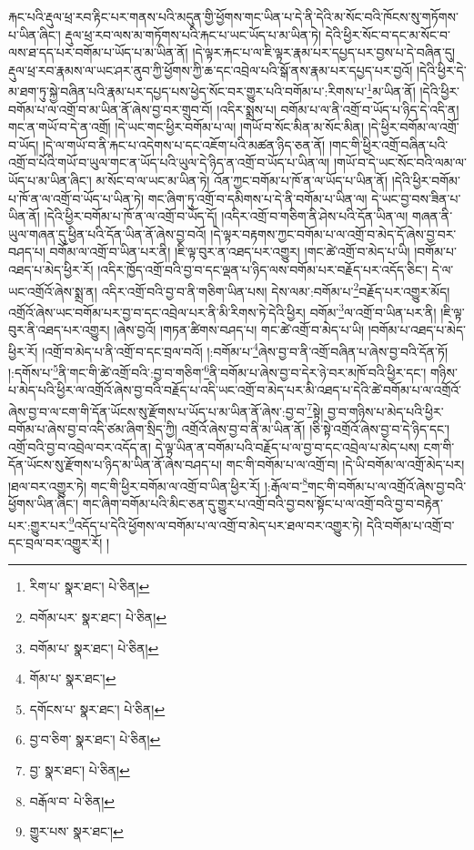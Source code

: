 རྐང་པའི་རྡུལ་ཕྲ་རབ་རྟིང་པར་གནས་པའི་མདུན་གྱི་ཕྱོགས་གང་ཡིན་པ་དེ་ནི་དེའི་མ་སོང་བའི་ཁོངས་སུ་གཏོགས་པ་ཡིན་ཞིང་། རྡུལ་ཕྲ་རབ་ལས་མ་གཏོགས་པའི་རྐང་པ་ཡང་ཡོད་པ་མ་ཡིན་ཏེ། དེའི་ཕྱིར་སོང་བ་དང་མ་སོང་བ་ལས་ཐ་དད་པར་བགོམ་པ་ཡོད་པ་མ་ཡིན་ནོ། །དེ་ལྟར་རྐང་པ་ལ་ཇི་ལྟར་རྣམ་པར་དཔྱད་པར་བྱས་པ་དེ་བཞིན་དུ། རྡུལ་ཕྲ་རབ་རྣམས་ལ་ཡང་ཤར་ནུབ་ཀྱི་ཕྱོགས་ཀྱི་ཆ་དང་འབྲེལ་པའི་སྒོ་ནས་རྣམ་པར་དཔྱད་པར་བྱའོ། །དེའི་ཕྱིར་དེ་མ་ཐག་ཏུ་སྐྱེ་བཞིན་པའི་རྣམ་པར་དཔྱད་པས་ཕྱེད་སོང་བར་གྱུར་པའི་བགོམ་པ་:རིགས་པ་\footnote{རིག་པ་  སྣར་ཐང་།  པེ་ཅིན། }མ་ཡིན་ནོ། །དེའི་ཕྱིར་བགོམ་པ་ལ་འགྲོ་བ་མ་ཡིན་ནོ་ཞེས་བྱ་བར་གྲུབ་བོ། །འདིར་སྨྲས་པ། བགོམ་པ་ལ་ནི་འགྲོ་བ་ཡོད་པ་ཉིད་དེ་འདི་ན། གང་ན་གཡོ་བ་དེ་ན་འགྲོ། །དེ་ཡང་གང་ཕྱིར་བགོམ་པ་ལ། །གཡོ་བ་སོང་མིན་མ་སོང་མིན། །དེ་ཕྱིར་བགོམ་ལ་འགྲོ་བ་ཡོད། །དེ་ལ་གཡོ་བ་ནི་རྐང་པ་འདེགས་པ་དང་འཇོག་པའི་མཚན་ཉིད་ཅན་ནོ། །གང་གི་ཕྱིར་འགྲོ་བཞིན་པའི་འགྲོ་བ་པོའི་གཡོ་བ་ཡུལ་གང་ན་ཡོད་པའི་ཡུལ་དེ་ཉིད་ན་འགྲོ་བ་ཡོད་པ་ཡིན་ལ། །གཡོ་བ་དེ་ཡང་སོང་བའི་ལམ་ལ་ཡོད་པ་མ་ཡིན་ཞིང་། མ་སོང་བ་ལ་ཡང་མ་ཡིན་ཏེ། འོན་ཀྱང་བགོམ་པ་ཁོ་ན་ལ་ཡོད་པ་ཡིན་ནོ། །དེའི་ཕྱིར་བགོམ་པ་ཁོ་ན་ལ་འགྲོ་བ་ཡོད་པ་ཡིན་ཏེ། གང་ཞིག་ཏུ་འགྲོ་བ་དམིགས་པ་དེ་ནི་བགོམ་པ་ཡིན་ལ། དེ་ཡང་བྱ་བས་ཟིན་པ་ཡིན་ནོ། །དེའི་ཕྱིར་བགོམ་པ་ཁོ་ན་ལ་འགྲོ་བ་ཡོད་དོ། །འདིར་འགྲོ་བ་གཅིག་ནི་ཤེས་པའི་དོན་ཡིན་ལ། གཞན་ནི་ཡུལ་གཞན་དུ་ཕྱིན་པའི་དོན་ཡིན་ནོ་ཞེས་བྱ་བའོ། །དེ་ལྟར་བརྟགས་ཀྱང་བགོམ་པ་ལ་འགྲོ་བ་མེད་དོ་ཞེས་བྱ་བར་བཤད་པ། བགོམ་ལ་འགྲོ་བ་ཡིན་པར་ནི། །ཇི་ལྟ་བུར་ན་འཐད་པར་འགྱུར། །གང་ཚེ་འགྲོ་བ་མེད་པ་ཡི། །བགོམ་པ་འཐད་པ་མེད་ཕྱིར་རོ། །འདིར་ཁྱོད་འགྲོ་བའི་བྱ་བ་དང་ལྡན་པ་ཉིད་ལས་བགོམ་པར་བརྗོད་པར་འདོད་ཅིང་། དེ་ལ་ཡང་འགྲོའོ་ཞེས་སྨྲ་ན། འདིར་འགྲོ་བའི་བྱ་བ་ནི་གཅིག་ཡིན་པས། དེས་ལམ་:བགོམ་པ་\footnote{བགོམ་པར་  སྣར་ཐང་།  པེ་ཅིན། }བརྗོད་པར་འགྱུར་མོད། འགྲོའོ་ཞེས་ཡང་བགོམ་པར་བྱ་བ་དང་འབྲེལ་པར་ནི་མི་རིགས་ཏེ་དེའི་ཕྱིར། བགོམ་\footnote{བགོམ་པ་  སྣར་ཐང་།  པེ་ཅིན། }ལ་འགྲོ་བ་ཡིན་པར་ནི། །ཇི་ལྟ་བུར་ནི་འཐད་པར་འགྱུར། །ཞེས་བྱའོ། །གཏན་ཚིགས་བཤད་པ། གང་ཚེ་འགྲོ་བ་མེད་པ་ཡི། །བགོམ་པ་འཐད་པ་མེད་ཕྱིར་རོ། །འགྲོ་བ་མེད་པ་ནི་འགྲོ་བ་དང་བྲལ་བའོ། །:བགོམ་པ་\footnote{གོམ་པ་  སྣར་ཐང་། }ཞེས་བྱ་བ་ནི་འགྲོ་བཞིན་པ་ཞེས་བྱ་བའི་དོན་ཏོ། །:དགོས་པ་\footnote{དགོངས་པ་  སྣར་ཐང་།  པེ་ཅིན། }ནི་གང་གི་ཚེ་འགྲོ་བའི་:བྱ་བ་གཅིག་\footnote{བྱ་བ་ཅིག་  སྣར་ཐང་།  པེ་ཅིན། }ནི་བགོམ་པ་ཞེས་བྱ་བ་དེར་ཉེ་བར་མཁོ་བའི་ཕྱིར་དང་། གཉིས་པ་མེད་པའི་ཕྱིར་ལ་འགྲོའོ་ཞེས་བྱ་བའི་བརྗོད་པ་འདི་ཡང་འགྲོ་བ་མེད་པར་མི་འཐད་པ་དེའི་ཚེ་བགོམ་པ་ལ་འགྲོའོ་ཞེས་བྱ་བ་ལ་ངག་གི་དོན་ཡོངས་སུ་རྫོགས་པ་ཡོད་པ་མ་ཡིན་ནོ་ཞེས་:བྱ་བ་\footnote{བྱ་  སྣར་ཐང་།  པེ་ཅིན། }སྟེ། བྱ་བ་གཉིས་པ་མེད་པའི་ཕྱིར་བགོམ་པ་ཞེས་བྱ་བ་འདི་ཙམ་ཞིག་སྲིད་ཀྱི། འགྲོའོ་ཞེས་བྱ་བ་ནི་མ་ཡིན་ནོ། །ཅི་སྟེ་འགྲོའོ་ཞེས་བྱ་བ་དེ་ཉིད་དང་། འགྲོ་བའི་བྱ་བ་འབྲེལ་བར་འདོད་ན། དེ་ལྟ་ཡིན་ན་བགོམ་པའི་བརྗོད་པ་ལ་བྱ་བ་དང་འབྲེལ་པ་མེད་པས། ངག་གི་དོན་ཡོངས་སུ་རྫོགས་པ་ཉིད་མ་ཡིན་ནོ་ཞེས་བཤད་པ། གང་གི་བགོམ་པ་ལ་འགྲོ་བ། །དེ་ཡི་བགོམ་ལ་འགྲོ་མེད་པར། །ཐལ་བར་འགྱུར་ཏེ། གང་གི་ཕྱིར་བགོམ་ལ་འགྲོ་བ་ཡིན་ཕྱིར་རོ། །:རྒོལ་བ་\footnote{བརྒོལ་བ་  པེ་ཅིན། }གང་གི་བགོམ་པ་ལ་འགྲོའོ་ཞེས་བྱ་བའི་ཕྱོགས་ཡིན་ཞིང་། གང་ཞིག་བགོམ་པའི་མིང་ཅན་དུ་གྱུར་པ་འགྲོ་བའི་བྱ་བས་སྟོང་པ་ལ་འགྲོ་བའི་བྱ་བ་བརྟེན་པར་:གྱུར་པར་\footnote{གྱུར་པས་  སྣར་ཐང་། }འདོད་པ་དེའི་ཕྱོགས་ལ་བགོམ་པ་ལ་འགྲོ་བ་མེད་པར་ཐལ་བར་འགྱུར་ཏེ། དེའི་བགོམ་པ་འགྲོ་བ་དང་བྲལ་བར་འགྱུར་རོ། །
